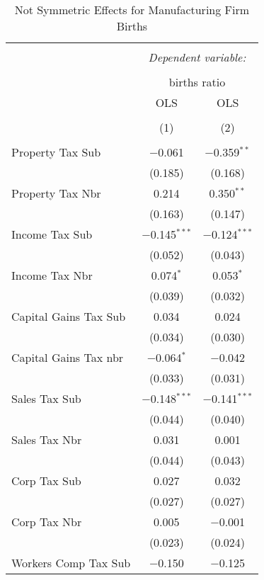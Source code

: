 
\begin{table}[!htbp] \centering 
  \caption{Not Symmetric Effects for  Manufacturing Firm Births} 
  \label{31-33noequality} 
\footnotesize 
\begin{tabular}{@{\extracolsep{5pt}}lcc} 
\\[-1.8ex]\hline 
\hline \\[-1.8ex] 
 & \multicolumn{2}{c}{\textit{Dependent variable:}} \\ 
\cline{2-3} 
\\[-1.8ex] & \multicolumn{2}{c}{births ratio} \\ 
 & OLS & OLS \\ 
\\[-1.8ex] & (1) & (2)\\ 
\hline \\[-1.8ex] 
 Property Tax Sub & $-$0.061 & $-$0.359$^{**}$ \\ 
  & (0.185) & (0.168) \\ 
  Property Tax Nbr & 0.214 & 0.350$^{**}$ \\ 
  & (0.163) & (0.147) \\ 
  Income Tax Sub & $-$0.145$^{***}$ & $-$0.124$^{***}$ \\ 
  & (0.052) & (0.043) \\ 
  Income Tax Nbr & 0.074$^{*}$ & 0.053$^{*}$ \\ 
  & (0.039) & (0.032) \\ 
  Capital Gains Tax Sub & 0.034 & 0.024 \\ 
  & (0.034) & (0.030) \\ 
  Capital Gains Tax nbr & $-$0.064$^{*}$ & $-$0.042 \\ 
  & (0.033) & (0.031) \\ 
  Sales Tax Sub & $-$0.148$^{***}$ & $-$0.141$^{***}$ \\ 
  & (0.044) & (0.040) \\ 
  Sales Tax Nbr & 0.031 & 0.001 \\ 
  & (0.044) & (0.043) \\ 
  Corp Tax Sub & 0.027 & 0.032 \\ 
  & (0.027) & (0.027) \\ 
  Corp Tax Nbr & 0.005 & $-$0.001 \\ 
  & (0.023) & (0.024) \\ 
  Workers Comp Tax Sub & $-$0.150 & $-$0.125 \\ 

\end{tabular}
\end{table}
